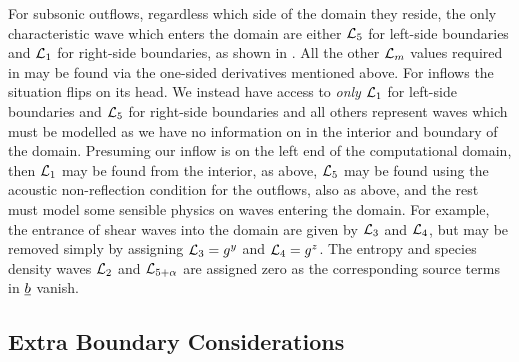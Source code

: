 For subsonic outflows, regardless which side of the domain they reside, the only characteristic wave which enters the domain are either $\mathcal{L}_5$ for left-side boundaries and $\mathcal{L}_1$ for right-side boundaries, as shown in . All the other $\mathcal{L}_m$ values required in  may be found via the one-sided derivatives mentioned above. For inflows the situation flips on its head. We instead have access to \emph{only} $\mathcal{L}_1$ for left-side boundaries and $\mathcal{L}_5$ for right-side boundaries and all others represent waves which must be modelled as we have no information on in the interior and boundary of the domain. Presuming our inflow is on the left end of the computational domain, then $\mathcal{L}_1$ may be found from the interior, as above, $\mathcal{L}_5$ may be found using the acoustic non-reflection condition for the outflows, also as above, and the rest must model some sensible physics on waves entering the domain. For example, the entrance of shear waves into the domain are given by $\mathcal{L}_{3}$ and $\mathcal{L}_{4}$, but may be removed simply by assigning $\mathcal{L}_{3} = g^y$ and $\mathcal{L}_{4} = g^z$. The entropy and species density waves $\mathcal{L}_{2}$ and $\mathcal{L}_{5 + \alpha}$ are assigned zero as the corresponding source terms in $\underline{b}$ vanish.




\subsection{Extra Boundary Considerations}







